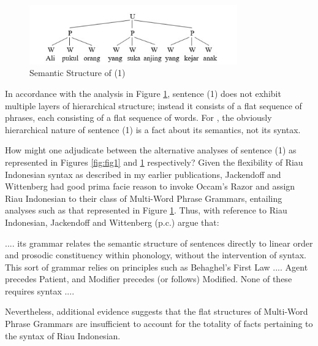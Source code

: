 \documentclass[output=paper,colorlinks,citecolor=brown
]{langscibook}
\begin{document}
\begin{figure}[hbt!]
\centering
\includegraphics[width=0.8\textwidth]{gil_figure3.png}
\caption{\label{fig:fig3}Semantic Structure of (1)}
\end{figure}

In accordance with the analysis in Figure \ref{fig:fig3}, sentence (1) does not exhibit multiple layers of hierarchical structure; instead it consists of a flat sequence of phrases, each consisting of a flat sequence of words.  For \citet{jackendoff2014syntax,jackendoff2017linear}, the obviously hierarchical nature of sentence (1) is a fact about its semantics, not its syntax. 

How might one adjudicate between the alternative analyses of sentence (1) as represented in Figures \ref{fig:fig1} and \ref{fig:fig3} respectively?  Given the flexibility of Riau Indonesian syntax as described in my earlier publications, Jackendoff and Wittenberg had good prima facie reason to invoke Occam's Razor and assign Riau Indonesian to their class of Multi-Word Phrase Grammars, entailing analyses such as that represented in Figure \ref{fig:fig3}.  Thus, with reference to Riau Indonesian, Jackendoff and Wittenberg (p.c.) argue that:

\begin{displayquote}
    .... its grammar relates the semantic structure of sentences directly to linear order and prosodic constituency within phonology, without the intervention of syntax.  This sort of grammar relies on principles such as Behaghel’s First Law .... Agent precedes Patient, and Modifier precedes (or follows) Modified.  None of these requires syntax ....
\end{displayquote}
Nevertheless, additional evidence suggests that the flat structures of Multi-Word Phrase Grammars are insufficient to account for the totality of facts pertaining to the syntax of Riau Indonesian.
\end{document}
